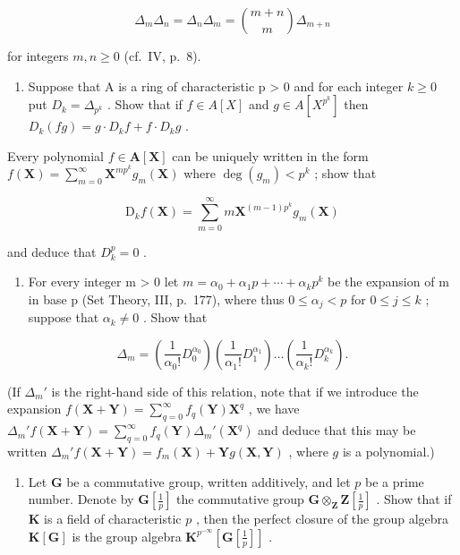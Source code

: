 \[
\Delta_ {m} \Delta_ {n} = \Delta_ {n} \Delta_ {m} = \binom {m + n} {m} \Delta_ {m + n}
\]

for integers \(m, n \geqslant 0\) (cf.~IV, p.~8).

\begin{enumerate}
\def\labelenumi{\alph{enumi})}
\setcounter{enumi}{1}
\tightlist
\item
  Suppose that A is a ring of characteristic p \textgreater{} 0 and for each integer \(k \geqslant 0\) put \(D_{k} = \Delta_{p^{k}}\) . Show that if \(f \in A[X]\) and \(g \in A[X^{p^{k}}]\) then \(D_{k}(fg) = g \cdot D_{k}f + f \cdot D_{k}g\) .
\end{enumerate}

Every polynomial \(f \in \mathbf{A}[\mathbf{X}]\) can be uniquely written in the form \(f(\mathbf{X}) = \sum_{m=0}^{\infty} \mathbf{X}^{mp^k} g_m(\mathbf{X})\) where \(\deg(g_m) < p^k\) ; show that

\[
\mathrm{D} _ {k} f (\mathbf {X}) = \sum_ {m = 0} ^ {\infty} m \mathbf {X} ^ {(m - 1) p ^ {k}} g _ {m} (\mathbf {X})
\]

and deduce that \(D_{k}^{p}=0\) .

\begin{enumerate}
\def\labelenumi{\alph{enumi})}
\setcounter{enumi}{2}
\tightlist
\item
  For every integer m \textgreater{} 0 let \(m = \alpha_{0} + \alpha_{1}p + \cdots + \alpha_{k}p^{k}\) be the expansion of m in base p (Set Theory, III, p.~177), where thus \(0 \leqslant \alpha_{j} < p\) for \(0 \leqslant j \leqslant k\) ; suppose that \(\alpha_{k} \neq 0\) . Show that
\end{enumerate}

\[
\Delta_ {m} = \left(\frac {1}{\alpha_ {0} !} D _ {0} ^ {\alpha_ {0}}\right) \left(\frac {1}{\alpha_ {1} !} D _ {1} ^ {\alpha_ {1}}\right) \dots \left(\frac {1}{\alpha_ {k} !} D _ {k} ^ {\alpha_ {k}}\right).
\]

(If \(\Delta_m'\) is the right-hand side of this relation, note that if we introduce the expansion \(f(\mathbf{X} + \mathbf{Y}) = \sum_{q=0}^{\infty} f_q(\mathbf{Y}) \mathbf{X}^q\) , we have \(\Delta_m' f(\mathbf{X} + \mathbf{Y}) = \sum_{q=0}^{\infty} f_q(\mathbf{Y}) \Delta_m'(\mathbf{X}^q)\) and deduce that this may be written \(\Delta_m' f(\mathbf{X} + \mathbf{Y}) = f_m(\mathbf{X}) + \mathbf{Y} g(\mathbf{X}, \mathbf{Y})\) , where \(g\) is a polynomial.)

\begin{enumerate}
\def\labelenumi{\arabic{enumi})}
\setcounter{enumi}{3}
\tightlist
\item
  Let \(\mathbf{G}\) be a commutative group, written additively, and let \(p\) be a prime number. Denote by \(\mathbf{G}\left[\frac{1}{p}\right]\) the commutative group \(\mathbf{G} \otimes_{\mathbf{Z}} \mathbf{Z}\left[\frac{1}{p}\right]\) . Show that if \(\mathbf{K}\) is a field of characteristic \(p\) , then the perfect closure of the group algebra \(\mathbf{K}[\mathbf{G}]\) is the group algebra \(\mathbf{K}^{p^{-\infty}}\left[\mathbf{G}\left[\frac{1}{p}\right]\right]\) .
\end{enumerate}

